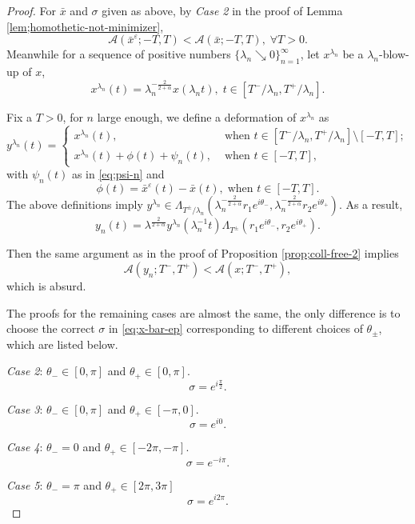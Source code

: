 \documentclass[11pt]{amsart}
\newcommand{\A}{\mathcal A}
\newcommand{\al}{\alpha}
\newcommand{\ep}{\varepsilon}
\newcommand{\tht}{\theta}
\newcommand{\lmd}{\lambda}
\newcommand{\sg}{\sigma}
\newcommand{\Lmd}{\Lambda}
\theoremstyle{plain}
\theoremstyle{definition}
\theoremstyle{remark}
\begin{document}
\begin{proof}
For $\bar{x}$ and $\sg$ given as above, by \emph{Case 2} in the proof of Lemma \ref{lem;homothetic-not-minimizer},
$$ \A(\bar{x}^{\ep}; -T, T) < \A(\bar{x}; -T, T), \;\forall T>0. $$
Meanwhile for a sequence of positive numbers $\{ \lmd_n \searrow 0 \}_{n =1}^{\infty}$, let $x^{\lmd_n}$ be a $\lmd_n$-blow-up of $x$, 
$$ x^{\lmd_n}(t) = \lmd_n^{-\frac{2}{2+\al}} x(\lmd_n t), \;  t \in [T^-/\lmd_n, T^+/\lmd_n]. $$

Fix a $T>0$, for $n$ large enough, we define a deformation of $x^{\lmd_n}$ as 
$$ y^{\lmd_n}(t) = \begin{cases}
x^{\lmd_n}(t), & \text{ when } t \in [T^-/\lmd_n, T^+/\lmd_n] \setminus [-T, T];\\
x^{\lmd_n}(t) + \phi(t) + \psi_n(t), & \text{ when } t \in [-T, T],
\end{cases}
$$
with $\psi_n(t)$ as in \eqref{eq;psi-n} and 
$$ \phi(t) = \bar{x}^{\ep}(t) - \bar{x}(t), \; \text{when } t \in [-T, T]. $$
The above definitions imply $y^{\lmd_n} \in \Lmd_{T^{\pm}/\lmd_n}( \lmd_n^{-\frac{2}{2 +\al}}r_1e^{i \tht_-}, \lmd_n^{-\frac{2}{2+\al}}r_2 e^{i \tht_+} )$. As a result,
$$ y_n(t) = \lmd^{\frac{2}{2+\al}} y^{\lmd_n}(\lmd_n^{-1} t)\Lmd_{T^{\pm}}(r_1 e^{i \tht_-}, r_2 e^{i \tht_+}). $$

Then the same argument as in the proof of Proposition \ref{prop;coll-free-2} implies 
$$ \A(y_n; T^-, T^+) < \A(x; T^-, T^+), $$
which is absurd. 

The proofs for the remaining cases are almost the same, the only difference is to choose the correct $\sg$ in \eqref{eq;x-bar-ep} corresponding to different choices of $\tht_{\pm}$, which are listed below. 

\emph{Case 2}: $\tht_- \in [0, \pi]$ and $\tht_+ \in [0, \pi]$. 
$$ \sg = e^{i \frac{\pi}{2}}. $$


\emph{Case 3}: $\tht_- \in [0, \pi]$ and $\tht_+ \in [-\pi, 0]$.
$$ \sg = e^{i 0}. $$



\emph{Case 4}: $\tht_- = 0$ and $\tht_+ \in [-2\pi, -\pi]$. 
$$ \sg = e^{-i \pi} . $$






\emph{Case 5}: $\tht_- = \pi$ and $\tht_+ \in [2\pi, 3\pi]$
$$ \sg = e^{i 2\pi}. $$
 
 

\end{proof}

\end{document}
